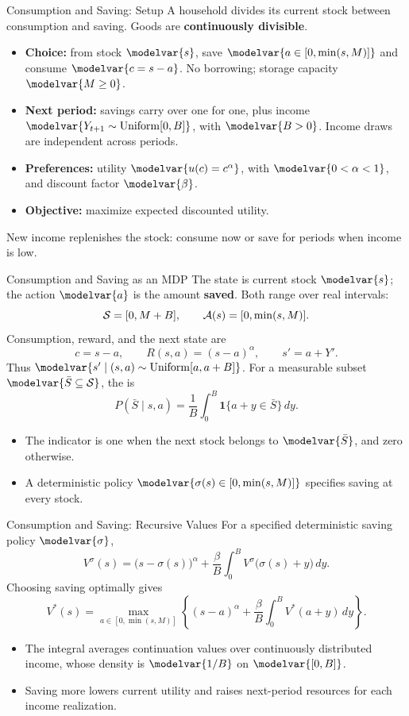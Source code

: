 \begin{frame}{Consumption and Saving: Setup}
A household divides its current stock between consumption and saving. Goods are \textbf{continuously divisible}.
\begin{itemize}
\item \textbf{Choice:} from stock \(\modelvar{s}\), save \(\modelvar{a\in[0,\min(s,M)]}\) and consume \(\modelvar{c=s-a}\). No borrowing; storage capacity \(\modelvar{M\geq0}\).
\item \textbf{Next period:} savings carry over one for one, plus income \(\modelvar{Y_{t+1}\sim\mathrm{Uniform}[0,B]}\), with \(\modelvar{B>0}\). Income draws are independent across periods.
\item \textbf{Preferences:} utility \(\modelvar{u(c)=c^\alpha}\), with \(\modelvar{0<\alpha<1}\), and discount factor \(\modelvar{\beta}\).
\item \textbf{Objective:} maximize expected discounted utility.
\end{itemize}
New income replenishes the stock: consume now or save for periods when income is low.
\end{frame}

\begin{frame}{Consumption and Saving as an MDP}
\small
The state is current stock \(\modelvar{s}\); the action \(\modelvar{a}\) is the amount \textbf{saved}. Both range over real intervals:
\[\mathcal S=[0,M+B],\qquad \mathcal A(s)=[0,\min(s,M)].\]
Consumption, reward, and the next state are
\[c=s-a,\qquad R(s,a)=(s-a)^\alpha,\qquad s'=a+Y'.\]
Thus \(\modelvar{s'\mid(s,a)\sim\mathrm{Uniform}[a,a+B]}\). For a measurable subset \(\modelvar{\bar S\subseteq\Sset}\), the  is
\[P(\bar S\mid s,a)=\frac{1}{B}\int_0^B
\mathbf{1}\{a+y\in\bar S\}\,dy.\]
\begin{itemize}
\item The indicator is one when the next stock belongs to \(\modelvar{\bar S}\), and zero otherwise.
\item A deterministic policy \(\modelvar{\sigma(s)\in[0,\min(s,M)]}\) specifies saving at every stock.
\end{itemize}
\end{frame}

\begin{frame}{Consumption and Saving: Recursive Values}
For a specified deterministic saving policy \(\modelvar{\sigma}\),
\[V^\sigma(s)=\bigl(s-\sigma(s)\bigr)^\alpha
 +\frac{\beta}{B}\int_0^B V^\sigma\bigl(\sigma(s)+y\bigr)\,dy.\]
Choosing saving optimally gives
\[V^*(s)=\max_{a\in[0,\min(s,M)]}
\left\{(s-a)^\alpha+\frac{\beta}{B}\int_0^B V^*(a+y)\,dy\right\}.\]
\begin{itemize}
\item The integral averages continuation values over continuously distributed income, whose density is \(\modelvar{1/B}\) on \(\modelvar{[0,B]}\).
\item Saving more lowers current utility and raises next-period resources for each income realization.
\end{itemize}
\end{frame}

